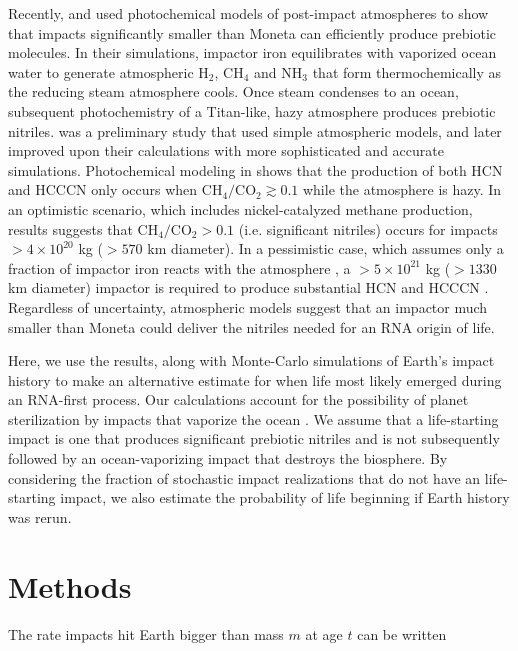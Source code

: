 \documentclass[manuscript]{aastex63}
\begin{document}
Recently, \citet{Wogan_2023} and \citet{Zahnle_2020} used photochemical models of post-impact atmospheres to show that impacts significantly smaller than Moneta can efficiently produce prebiotic molecules. In their simulations, impactor iron equilibrates with vaporized ocean water to generate atmospheric H$_2$, CH$_4$ and NH$_3$ that form thermochemically as the reducing steam atmosphere cools. Once steam condenses to an ocean, subsequent photochemistry of a Titan-like, hazy atmosphere produces prebiotic nitriles. \citet{Zahnle_2020} was a preliminary study that used simple atmospheric models, and later \citet{Wogan_2023} improved upon their calculations with more sophisticated and accurate simulations. Photochemical modeling in \citet{Wogan_2023} shows that the production of both HCN and HCCCN only occurs when $\mathrm{CH_4} / \mathrm{CO_2} \gtrsim 0.1$ while the atmosphere is hazy. In an optimistic scenario, which includes nickel-catalyzed methane production, results suggests that $\mathrm{CH_4} / \mathrm{CO_2} > 0.1$ (i.e. significant nitriles) occurs for impacts $> 4 \times 10^{20}$ kg ($> 570$ km diameter). In a pessimistic case, which assumes only a fraction of impactor iron reacts with the atmosphere \citep{Citron_2022}, a $> 5 \times 10^{21}$ kg ($> 1330$ km diameter) impactor is required to produce substantial HCN and HCCCN \citep{Wogan_2023}. Regardless of uncertainty, atmospheric models suggest that an impactor much smaller than Moneta could deliver the nitriles needed for an RNA origin of life.

Here, we use the \citet{Wogan_2023} results, along with Monte-Carlo simulations of Earth's impact history to make an alternative estimate for when life most likely emerged during an RNA-first process. Our calculations account for the possibility of planet sterilization by impacts that vaporize the ocean \citep{Sleep_1989}. We assume that a life-starting impact is one that produces significant prebiotic nitriles and is not subsequently followed by an ocean-vaporizing impact that destroys the biosphere. By considering the fraction of stochastic impact realizations that do not have an life-starting impact, we also estimate the probability of life beginning if Earth history was rerun.

\section{Methods} \label{sec:methods}
The rate impacts hit Earth bigger than mass $m$ at age $t$ can be written
\end{document}
